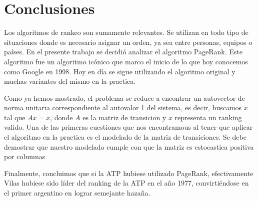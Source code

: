 \section{Conclusiones}

Los algoritmos de rankeo son sumamente relevantes. Se utilizan en todo tipo de situaciones donde es necesario asignar un orden, ya sea entre personas, equipos o países. En el presente trabajo se decidió analizar el algoritmo PageRank. Este algoritmo fue un algoritmo icónico que marco el inicio de lo que hoy conocemos como Google en 1998. Hoy en día se sigue utilizando el algoritmo original y muchas variantes del mismo en la practica.

Como ya hemos mostrado, el problema se reduce a encontrar un autovector de norma unitaria correspondiente al autovalor 1 del sistema, es decir, buscamos $x$ tal que $Ax = x$, donde $A$ es la matriz de transicion y $x$ representa un ranking valido. Una de las primeras cuestiones que nos encontramous al tener que aplicar el algoritmo en la practica es el modelado de la matriz de transiciones. Se debe demostrar que nuestro modelado cumple con que la matriz es estocastica positiva por columnas


Finalmente, concluimos que si la ATP hubiese utilizado PageRank, efectivamente Vilas hubiese sido líder del ranking de la ATP en el año 1977, convirtiéndose en el primer argentino en lograr semejante hazaña.